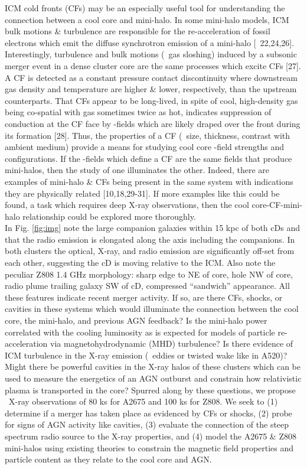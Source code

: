 \documentclass[letterpaper,11pt]{article}
\begin{document}
ICM cold fronts (CFs) may be an especially useful tool for
understanding the connection between a cool core and mini-halo. In some mini-halo
models, ICM bulk motions \& turbulence are responsible for the
re-acceleration of fossil electrons which emit the diffuse synchrotron
emission of a mini-halo [\eg\ 22,24,26]. Interestingly, turbulence and bulk
motions (\eg\ gas sloshing) induced by a subsonic merger event in a
dense cluster core are the same processes which excite CFs [27]. A CF
is detected as a constant pressure contact discontinuity where
downstream gas density and temperature are higher \& lower,
respectively, than the upstream counterparts. That CFs appear to be
long-lived, in spite of cool, high-density gas being co-spatial with
gas sometimes twice as hot, indicates suppression of conduction at the
CF face by \bmag-fields which are likely draped over the front during
its formation [28]. Thus, the properties of a CF (\ie\ size,
thickness, contrast with ambient medium) provide a means for studying
cool core \bmag-field strengths and configurations. If the
\bmag-fields which define a CF are the same fields that produce mini-halos,
then the study of one illuminates the other. Indeed, there are
examples of mini-halo \& CFs being present in the same system with
indications they are physically related [10,18,29-31]. If more
examples like this could be found, a task which requires deep X-ray
observations, then the cool core-CF-mini-halo relationship could be explored
more thoroughly.\\

 In
Fig. \ref{fig:img} note the large companion galaxies within 15 kpc of
both cDs and that the radio emission is elongated along the axis
including the companions. In both clusters the optical, X-ray, and
radio emission are significantly off-set from each other, suggesting
the cD is moving relative to the ICM. Also note the peculiar Z808 1.4
GHz morphology: sharp edge to NE of core, hole NW of core, radio plume
trailing galaxy SW of cD, compressed ``sandwich'' appearance. All
these features indicate recent merger activity. If so, are there CFs,
shocks, or cavities in these systems which would illuminate the
connection between the cool core, the mini-halo, and previous AGN feedback?
Is the mini-halo power correlated with the cooling luminosity as is expected
for models of particle re-acceleration via magnetohydrodynamic (MHD)
turbulence? Is there evidence of ICM turbulence in the X-ray emission
(\eg\ eddies or twisted wake like in A520)? Might there be powerful
cavities in the X-ray halos of these clusters which can be used to
measure the energetics of an AGN outburst and constrain how
relativistic plasma is transported in the core? Spurred along by these
questions, we propose \chandra\ X-ray observations of 80 ks for A2675
and 100 ks for Z808. We seek to (1) determine if a merger has taken
place as evidenced by CFs or shocks, (2) probe for signs of AGN
activity like cavities, (3) evaluate the connection of the steep
spectrum radio source to the X-ray properties, and (4) model the A2675
\& Z808 mini-halos using existing theories to constrain the magnetic field
properties and particle content as they relate to the cool core and
AGN.\\
\end{document}
